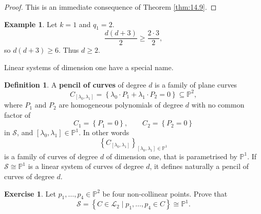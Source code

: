 \documentclass{article}
\renewcommand{\P}{\mathbb{P}}
\renewcommand{\L}{\mathcal{L}}
\renewcommand{\S}{\mathcal{S}}
\newcommand{\rb}[1]{\left( #1 \right)}
\renewcommand{\sb}[1]{\left[ #1 \right]}
\newcommand{\cb}[1]{\left\{ #1 \right\}}
\theoremstyle{definition}\newtheorem{definition}{Definition}[section]
\theoremstyle{definition}\newtheorem{notation}[definition]{Notation}
\theoremstyle{definition}\newtheorem{remark}[definition]{Remark}
\theoremstyle{definition}\newtheorem{example1}[definition]{Example}
\theoremstyle{definition}\newtheorem{fact}{Fact}
\theoremstyle{definition}\newtheorem{exercise}{Exercise}
\theoremstyle{definition}\newtheorem*{example2}{Example}
\begin{document}
\begin{proof}
This is an immediate consequence of Theorem \ref{thm:14.9}.
\end{proof}

\begin{example2}
Let $ k = 1 $ and $ q_1 = 2 $.
$$ \dfrac{d\rb{d + 3}}{2} \ge \dfrac{2 \cdot 3}{2}, $$
so $ d\rb{d + 3} \ge 6 $. Thus $ d \ge 2 $.
\end{example2}

Linear systems of dimension one have a special name.

\begin{definition}
A \textbf{pencil of curves} of degree $ d $ is a family of plane curves
$$ C_{\sb{\lambda_0, \lambda_1}} = \cb{\lambda_0 \cdot P_1 + \lambda_1 \cdot P_2 = 0} \subseteq \P^2, $$
where $ P_1 $ and $ P_2 $ are homogeneous polynomials of degree $ d $ with no common factor of
$$ C_1 = \cb{P_1 = 0}, \qquad C_2 = \cb{P_2 = 0} $$
in $ \S $, and $ \sb{\lambda_0, \lambda_1} \in \P^1 $. In other words
$$ \cb{C_{\sb{\lambda_0, \lambda_1}}}_{\sb{\lambda_0, \lambda_1} \in \P^1} $$
is a family of curves of degree $ d $ of dimension one, that is parametrised by $ \P^1 $. If $ \S \cong \P^1 $ is a linear system of curves of degree $ d $, it defines naturally a pencil of curves of degree $ d $.
\end{definition}

\begin{exercise}
\label{ex:40}
Let $ p_1, \dots, p_4 \in \P^2 $ be four non-collinear points. Prove that
$$ \S = \cb{C \in \L_2 \mid p_1, \dots, p_4 \in C} \cong \P^1. $$
\end{exercise}
\end{document}
